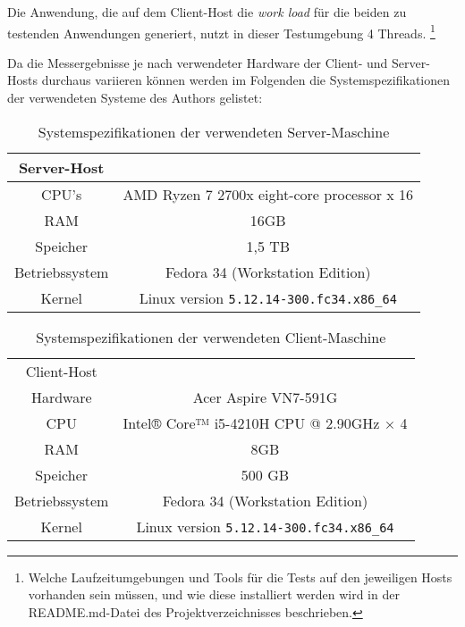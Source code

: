 Die Anwendung, die auf dem Client-Host die \textit{work load} für die beiden zu testenden Anwendungen generiert,
nutzt in dieser Testumgebung 4 Threads.
\footnote{Welche Laufzeitumgebungen und Tools für die Tests auf den jeweiligen Hosts vorhanden sein müssen, und wie diese installiert werden
    wird in der README.md-Datei des Projektverzeichnisses beschrieben.}

Da die Messergebnisse je nach verwendeter Hardware der Client- und Server-Hosts durchaus variieren können werden im Folgenden
die Systemspezifikationen der verwendeten Systeme des Authors gelistet:
\begin{table}[ht!]
    \centering
    \begin{tabular}{| c | c |}
        \hline
        Server-Host                                                  \\
        \hline
        CPU's          & AMD Ryzen 7 2700x eight-core processor x 16 \\
        \hline
        RAM            & 16GB                                        \\
        \hline
        Speicher       & 1,5 TB                                      \\
        \hline
        Betriebssystem & Fedora 34 (Workstation Edition)             \\
        \hline
        Kernel         & Linux version \verb|5.12.14-300.fc34.x86_64|   \\
        \hline
    \end{tabular}
    \caption{Systemspezifikationen der verwendeten Server-Maschine}
    \label{table:system_host}
\end{table}

\begin{table}[ht!]
    \centering
    \begin{tabular}{| c | c |}
        \hline
        Client-Host                                                \\
        Hardware       & Acer Aspire VN7-591G                      \\
        \hline
        CPU            & Intel® Core™ i5-4210H CPU @ 2.90GHz × 4   \\
        \hline
        RAM            & 8GB                                       \\
        \hline
        Speicher       & 500 GB                                    \\
        \hline
        Betriebssystem & Fedora 34 (Workstation Edition)           \\
        \hline
        Kernel         & Linux version \verb|5.12.14-300.fc34.x86_64| \\
        \hline
    \end{tabular}
    \caption{Systemspezifikationen der verwendeten Client-Maschine}
    \label{table:system_client}
\end{table}

